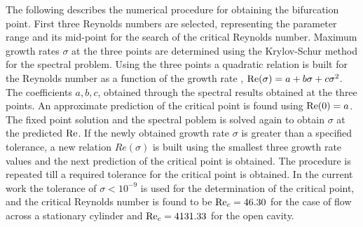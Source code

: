 The following describes the numerical procedure for obtaining the bifurcation point. 
First three Reynolds numbers are selected, representing the parameter range and its mid-point for the search of the critical Reynolds number. Maximum growth rates $\sigma$ at the three points are determined using the Krylov-Schur method \citep{stewart02} for the spectral problem. Using the three points a quadratic relation is built for the Reynolds number as a function of the growth rate \ie, $\mathrm{Re}(\sigma) = a + b\sigma + c\sigma^{2}$. The coefficients $a,b,c$, obtained through the spectral results obtained at the three points. An approximate prediction of the critical point is found using $\mathrm{Re}(0) = a$. The fixed point solution and the spectral poblem is solved again to obtain $\sigma$ at the predicted $\mathrm{Re}$. If the newly obtained growth rate $\sigma$ is greater than a specified tolerance, a new relation $Re(\sigma)$ is built using the smallest three growth rate values and the next prediction of the critical point is obtained.  The procedure is repeated till a required tolerance for the critical point is obtained. In the current work the tolerance of $\sigma<10^{-9}$ is used for the determination of the critical point, and the critical Reynolds number is found to be $\mathrm{Re}_{c} = 46.30$ for the case of flow across a stationary cylinder and $\mathrm{Re}_{c}=4131.33$ for the open cavity.




